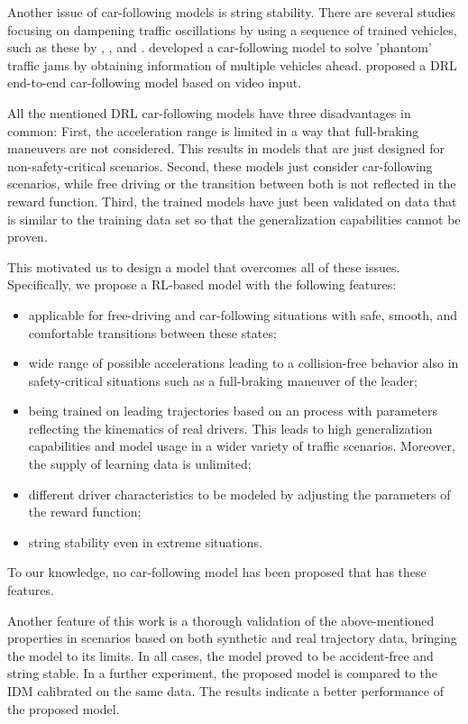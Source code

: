 \documentclass[review]{elsarticle}
\providecommand{\3}{{\ss}}
\begin{document}
	Another issue of car-following models is string stability. There are
	several studies focusing on dampening traffic oscillations by using a
	sequence of trained vehicles, such as these by \cite{qu2020jointly}, \cite{DissipatingStopAndGoWaves}, and \cite{DampenStopAndGoTraffic}. \cite{Patrol} developed a car-following model to solve 'phantom' traffic jams by obtaining information of multiple vehicles ahead. \cite{EndToEndCF} proposed a DRL end-to-end car-following model based on video input.
	
	All the mentioned DRL car-following models have three disadvantages in
	common: First, the acceleration range is limited in a way that
	full-braking maneuvers are not considered. This results in models that are just designed for non-safety-critical scenarios. Second, these models just consider car-following scenarios, while free driving or the transition between both is not reflected in the reward function. Third, the trained models have just been validated on data that is similar to the training data set so that the generalization capabilities cannot be proven. 
	
	This motivated us to design a model that overcomes all of these issues.  Specifically,  we propose a RL-based model with the following features:
	
	
	\begin{itemize}
		\item applicable for free-driving and car-following situations with safe, smooth, and  comfortable transitions between these states;
		\item wide range of possible
		accelerations leading to a collision-free behavior
		also in safety-critical situations such as a full-braking maneuver of the leader;
		\item being trained on leading trajectories
		based on an \cite{OU} process with parameters reflecting the kinematics of real
		drivers. This leads to high generalization capabilities and
		model usage in a wider variety of traffic
		scenarios. Moreover, the supply of learning data is
		unlimited;
		\item different driver characteristics to be modeled by adjusting the parameters of the reward function;
		\item string stability even in extreme situations.
	\end{itemize}
	To our knowledge, no car-following model has been proposed that has these features.
	
	Another feature of this work is a thorough validation of the above-mentioned properties in scenarios based on both synthetic and real trajectory data, bringing the model to its limits. 
	In all cases, the model proved to be accident-free and string stable.
	In a further experiment, the proposed model is compared to the IDM calibrated on the same data. The results indicate a better performance of the proposed model.
	
\end{document}
